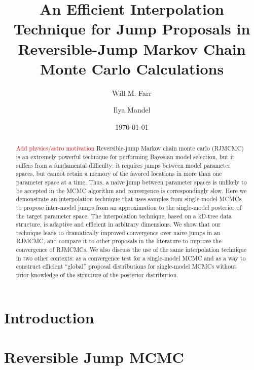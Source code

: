 \documentclass[prd,preprint]{revtex4}
\def\ilya{\textcolor{red}}
\begin{document}
\title{An Efficient Interpolation Technique for Jump Proposals in
  Reversible-Jump Markov Chain Monte Carlo Calculations}

\date{\today}

\author{Will M. Farr}


\author{Ilya Mandel}


\begin{abstract}
\ilya{Add physics/astro motivation}
  Reversible-jump Markov chain monte carlo (RJMCMC) is an extremely
  powerful technique for performing Bayesian model selection, but it
  suffers from a fundamental difficulty: it requires jumps between
  model parameter spaces, but cannot retain a memory of the favored
  locations in more than one parameter space at a time.  Thus, a naive
  jump between parameter spaces is unlikely to be accepted in the MCMC
  algorithm and convergence is correspondingly slow.  Here we
  demonstrate an interpolation technique that uses samples from
  single-model MCMCs to propose inter-model jumps from an
  approximation to the single-model posterior of the target parameter
  space.  The interpolation technique, based on a kD-tree
  data structure, is adaptive and efficient in arbitrary dimensions.
  We show that our technique leads to dramatically improved convergence
  over naive jumps in an RJMCMC, and compare it to other proposals in
  the literature to improve the convergence of RJMCMCs.  We also
  discuss the use of the same interpolation technique in two other
  contexts: as a convergence test for a single-model MCMC and as a way
  to construct efficient ``global'' proposal distributions for
  single-model MCMCs without prior knowledge of the structure of the
  posterior distribution.
\end{abstract}

\maketitle

\section{Introduction}

\section{Reversible Jump MCMC}
\end{document}
